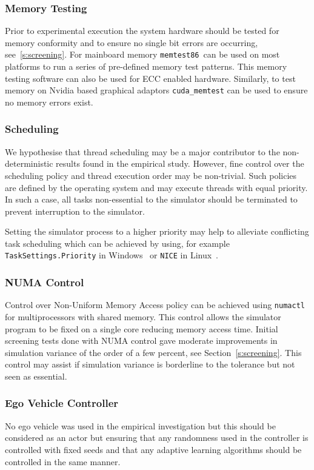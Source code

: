 \documentclass[letterpaper, 10 pt, journal, twoside]{IEEEtran}
\begin{document}
\subsubsection{Memory Testing}
Prior to experimental execution the system hardware should be tested for memory conformity and to ensure no single bit errors are occurring, see~\ref{s:screening}. For mainboard memory \texttt{memtest86}\ can be used on most platforms to run a series of pre-defined memory test patterns. This memory testing software can also be used for ECC enabled hardware. Similarly, to test memory on Nvidia based graphical adaptors \texttt{cuda\_memtest} can be used to ensure no memory errors exist.


\subsubsection{Scheduling}
We hypothesise that thread scheduling may be a major contributor to the non-deterministic results found in the empirical study. However, fine control over the scheduling policy and thread execution order may be non-trivial. Such policies are defined by the operating system and may execute threads with equal priority. In such a case, all tasks non-essential to the simulator should be terminated to prevent interruption to the simulator. 

Setting the simulator process to a higher priority may help to alleviate conflicting task scheduling which can be achieved by using, for example \texttt{TaskSettings.Priority} in Windows~\cite{TaskSettingWindows} or \texttt{NICE} in Linux~\cite{Nice_linux}.

\subsubsection{NUMA Control}
Control over Non-Uniform Memory Access policy can be achieved using \texttt{numactl} for multiprocessors with shared memory. This control allows the simulator program to be fixed on a single core reducing memory access time.
%
Initial screening tests done with NUMA control gave moderate improvements in simulation variance of the order of a few percent, see Section~\ref{s:screening}. This control may assist if simulation variance is borderline to the tolerance but not seen as essential.

\subsubsection{Ego Vehicle Controller}
No ego vehicle was used in the empirical investigation but this should be considered as an actor but ensuring that any randomness used in the controller is controlled with fixed seeds and that any adaptive learning algorithms should be controlled in the same manner.
\end{document}
